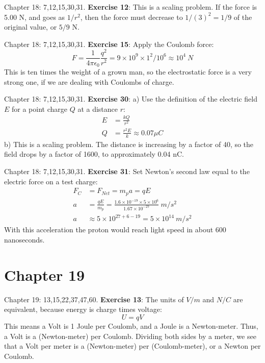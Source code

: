 \documentclass{beamer}
\begin{document}
\begin{frame}{Chapter 18: 7,12,15,30,31.}
\small
\textbf{Exercise 12}: This is a scaling problem.  If the force is 5.00 N, and goes as $1/r^2$, then the force must decrease to $1/(3)^2 = 1/9$ of the original value, or $5/9$ N.
\end{frame}

\begin{frame}{Chapter 18: 7,12,15,30,31.}
\small
\textbf{Exercise 15}: Apply the Coulomb force:
\begin{equation}
F = \frac{1}{4\pi\epsilon_0} \frac{q^2}{r^2} = 9 \times 10^9 \times 1^2 / 10^6 \approx 10^4 ~ N
\end{equation}
This is ten times the weight of a grown man, so the electrostatic force is a very strong one, if we are dealing with Coulombs of charge.
\end{frame}

\begin{frame}{Chapter 18: 7,12,15,30,31.}
\small
\textbf{Exercise 30}: a) Use the definition of the electric field $E$ for a point charge $Q$ at a distance $r$:
\begin{align}
E &= \frac{kQ}{r^2} \\
Q &= \frac{r^2 E}{k} \approx 0.07 \mu C
\end{align}
b) This is a scaling problem.  The distance is increasing by a factor of 40, so the field drops by a factor of 1600, to approximately 0.04 nC.
\end{frame}

\begin{frame}{Chapter 18: 7,12,15,30,31.}
\small
\textbf{Exercise 31}: Set Newton's second law equal to the electric force on a test charge:
\begin{align}
F_C &= F_{Net} = m_p a = q E \\
a &= \frac{qE}{m_p} = \frac{1.6\times 10^{-19}\times 5\times 10^6}{1.67 \times 10^{-27}} ~ m/s^2 \\
a &\approx 5 \times 10^{27+6-19} = 5 \times 10^{14} ~ m/s^2
\end{align}
With this acceleration the proton would reach light speed in about 600 nanoseconds.
\end{frame}

\section{Chapter 19}

\begin{frame}{Chapter 19: 13,15,22,37,47,60.}
\small
\textbf{Exercise 13}: The units of $V/m$ and $N/C$ are equivalent, because energy is charge times voltage:
\begin{equation}
U = qV
\end{equation}
This means a Volt is 1 Joule per Coulomb, and a Joule is a Newton-meter.  Thus, a Volt is a (Newton-meter) per Coulomb.  Dividing both sides by a meter, we see that a Volt per meter is a (Newton-meter) per (Coulomb-meter), or a Newton per Coulomb.
\end{frame}
\end{document}
